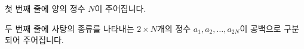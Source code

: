 첫 번째 줄에 양의 정수 $N$이 주어집니다.

두 번째 줄에 사탕의 종류를 나타내는 $2 \times N$개의 정수 $a_1,a_2,\ldots,a_{2N}$이 공백으로 구분되어 주어집니다.